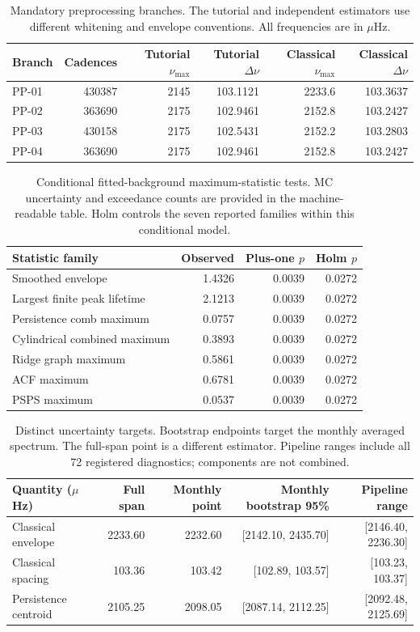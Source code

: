 \begin{table}[htbp]\centering\small
\caption{Mandatory preprocessing branches. The tutorial and independent estimators use different whitening and envelope conventions. All frequencies are in $\mu$Hz.}
\begin{tabular}{lrrrrr}\toprule
Branch & Cadences & Tutorial $\nu_{\max}$ & Tutorial $\Delta\nu$ & Classical $\nu_{\max}$ & Classical $\Delta\nu$\\\midrule
PP-01 & 430387 & 2145 & 103.1121 & 2233.6 & 103.3637\\
PP-02 & 363690 & 2175 & 102.9461 & 2152.8 & 103.2427\\
PP-03 & 430158 & 2175 & 102.5431 & 2152.2 & 103.2803\\
PP-04 & 363690 & 2175 & 102.9461 & 2152.8 & 103.2427\\
\bottomrule\end{tabular}\label{tab:branches}\end{table}
\begin{table}[htbp]\centering\small
\caption{Conditional fitted-background maximum-statistic tests. MC uncertainty and exceedance counts are provided in the machine-readable table. Holm controls the seven reported families within this conditional model.}
\begin{tabular}{lrrr}\toprule
Statistic family & Observed & Plus-one $p$ & Holm $p$\\\midrule
Smoothed envelope & 1.4326 & 0.0039 & 0.0272\\
Largest finite peak lifetime & 2.1213 & 0.0039 & 0.0272\\
Persistence comb maximum & 0.0757 & 0.0039 & 0.0272\\
Cylindrical combined maximum & 0.3893 & 0.0039 & 0.0272\\
Ridge graph maximum & 0.5861 & 0.0039 & 0.0272\\
ACF maximum & 0.6781 & 0.0039 & 0.0272\\
PSPS maximum & 0.0537 & 0.0039 & 0.0272\\
\bottomrule\end{tabular}\label{tab:nulls}\end{table}
\begin{table}[htbp]\centering\small
\caption{Distinct uncertainty targets. Bootstrap endpoints target the monthly averaged spectrum. The full-span point is a different estimator. Pipeline ranges include all 72 registered diagnostics; components are not combined.}
\begin{tabular}{lrrrr}\toprule
Quantity ($\mu$Hz) & Full span & Monthly point & Monthly bootstrap 95\% & Pipeline range\\\midrule
Classical envelope & 2233.60 & 2232.60 & [2142.10, 2435.70] & [2146.40, 2236.30]\\
Classical spacing & 103.36 & 103.42 & [102.89, 103.57] & [103.23, 103.37]\\
Persistence centroid & 2105.25 & 2098.05 & [2087.14, 2112.25] & [2092.48, 2125.69]\\
\bottomrule\end{tabular}\label{tab:uncertainty}\end{table}
